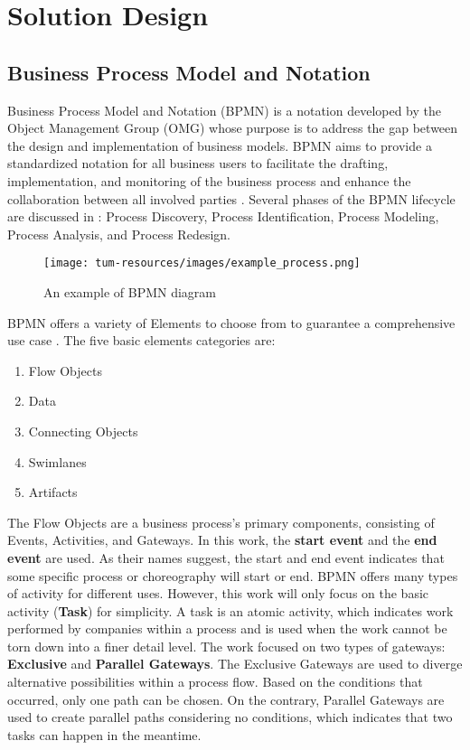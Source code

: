 \chapter{Solution Design}
\label{sec:solution}

\section{Business Process Model and Notation}
Business Process Model and Notation (BPMN) is a notation developed by the Object Management Group (OMG) whose purpose is to address the gap between the design and implementation of business models. BPMN aims to provide a standardized notation for all business users to facilitate the drafting, implementation, and monitoring of the business process and enhance the collaboration between all involved parties \cite{BPMN_tech_report}. Several phases of the BPMN lifecycle are discussed in \cite{BPMN_fundamentals}: Process Discovery, Process Identification, Process Modeling, Process Analysis, and Process Redesign.

\begin{figure}[h]
    \centering
    \caption{An example of BPMN diagram}
    \texttt{[image: tum-resources/images/example\_process.png]}
\end{figure}

BPMN offers a variety of Elements to choose from to guarantee a comprehensive use case \cite{BPMN_tech_report}. The five basic elements categories are:

\begin{enumerate}
    \item Flow Objects
    \item Data
    \item Connecting Objects
    \item Swimlanes
    \item Artifacts
\end{enumerate}

The Flow Objects are a business process's primary components, consisting of Events, Activities, and Gateways. In this work, the \textbf{start event} and the \textbf{end event} are used. As their names suggest, the start and end event indicates that some specific process or choreography will start or end. BPMN offers many types of activity for different uses. However, this work will only focus on the basic activity (\textbf{Task}) for simplicity. A task is an atomic activity, which indicates work performed by companies within a process and is used when the work cannot be torn down into a finer detail level. The work focused on two types of gateways: \textbf{Exclusive} and \textbf{Parallel Gateways}. The Exclusive Gateways are used to diverge alternative possibilities within a process flow. Based on the conditions that occurred, only one path can be chosen. On the contrary, Parallel Gateways are used to create parallel paths considering no conditions, which indicates that two tasks can happen in the meantime. 

